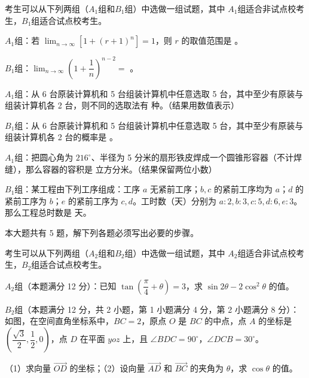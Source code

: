 考生可以从下列两组（$A_1$组和$B_1$组）中选做一组试题，其中 $A_1$组适合非试点校考生，$B_1$组适合试点校考生。

\begin{question}

$A_1$组：若 $\displaystyle\lim_{n\to\infty}\left[1+(r+1)^n\right]=1$，则 $r$ 的取值范围是 \gkblank{}。

$B_1$组：$\displaystyle\lim_{n\to\infty}\left(1+\dfrac1n\right)^{n-2}=$ \gkblank{}。

\end{question}
\begin{question}

$A_1$组：从 6 台原装计算机和 5 台组装计算机中任意选取 5 台，其中至少有原装与组装计算机各 2 台，则不同的选取法有 \gkblank{} 种。（结果用数值表示）

$B_1$组：从 6 台原装计算机和 5 台组装计算机中任意选取 5 台，其中至少有原装与组装计算机各 2 台的概率是 \gkblank{}。

\end{question}
\begin{question}

$A_1$组：把圆心角为 $216^\circ$、半径为 5 分米的扇形铁皮焊成一个圆锥形容器（不计焊缝），那么容器的容积是 \gkblank{} 立方分米。（结果保留两位小数）

$B_1$组：某工程由下列工序组成：工序 $a$ 无紧前工序；$b,c$ 的紧前工序均为 $a$；$d$ 的紧前工序为 $b$；$e$ 的紧前工序为 $c,d$。工时数（天）分别为 $a:2,b:3,c:5,d:6,e:3$。那么工程总时数是 \gkblank{} 天。

\end{question}

本大题共有 5 题，解下列各题必须写出必要的步骤。


考生可以从下列两组（$A_2$组和$B_2$组）中选做一组试题，其中 $A_2$组适合非试点校考生，$B_2$组适合试点校考生。

\Needspace{0.4\textheight}
\begin{question}

$A_2$组（本题满分 12 分）：已知 $\tan\left(\dfrac\pi4+\theta\right)=3$，求 $\sin2\theta-2\cos^2\theta$ 的值。

$B_2$组（本题满分 12 分，共 2 小题，第 1 小题满分 4 分，第 2 小题满分 8 分）：如图，在空间直角坐标系中，$BC=2$，原点 $O$ 是 $BC$ 的中点，点 $A$ 的坐标是 $\left(\dfrac{\sqrt3}{2},\dfrac12,0\right)$，点 $D$ 在平面 $yoz$ 上，且 $\angle BDC=90^\circ$，$\angle DCB=30^\circ$。
\nopagebreak[4]
\begin{center}\end{center}
\nopagebreak[4]
（1）求向量 $\overrightarrow{OD}$ 的坐标；（2）设向量 $\overrightarrow{AD}$ 和 $\overrightarrow{BC}$ 的夹角为 $\theta$，求 $\cos\theta$ 的值。

\end{question}

